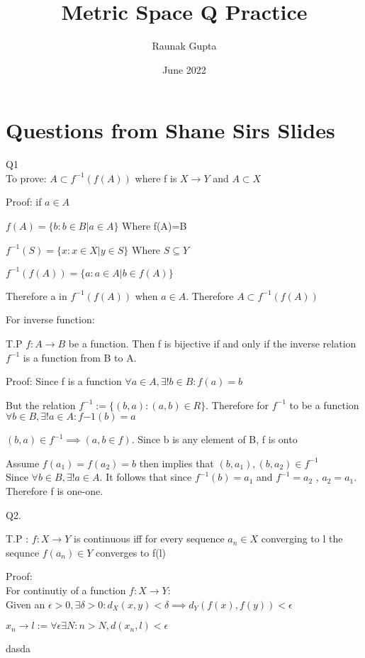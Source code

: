 \documentclass{article}
\title{Metric Space Q Practice}
\author{Raunak Gupta}
\date{June 2022}
\begin{document}
\maketitle

\section{Questions from Shane Sirs Slides}

\proof Q1\\
To prove: $A \subset f^{-1}(f(A))$ where f is $X \rightarrow Y$ and $A \subset X$

Proof: if $a \in A$

$f(A) =\{b : b\in B | a \in A \} $ Where f(A)=B

$f^{-1}(S)= \{x : x \in X | y \in S\}$ Where $S \subseteq Y$

$f^{-1}(f(A)) = \{a : a \in  A| b \in f(A)\} $

Therefore a in $f^{-1}(f(A))$ when $a \in A$. Therefore $A \subset f^{-1}(f(A))$ 




\proof For inverse function:

T.P $f : A \rightarrow B$ be a function. Then f is bijective if and only
if the inverse relation $f^{-1}$ is a function from B to A.

Proof: Since f is a function $\forall a \in A, \exists! b \in B : f(a)=b$

But the relation $f^{-1}:= \{ (b,a) : (a,b) \in R \}$. Therefore for $f^{-1}$ to be a function\\    $\forall b \in B, \exists! a \in A : f{-1}(b)=a$ 

$(b,a) \in f^{-1} \implies (a,b \in f)$. Since b is any element of B, f is onto

Assume $f(a_1)=f(a_2)=b$ then implies that $(b,a_1), (b,a_2) \in f^{-1} $ \\ Since $\forall b \in B, \exists! a \in A$. It follows that since $f^{-1}(b)=a_1$ and  $f^{-1}= a_2$ , $a_2 = a_1$. Therefore f is one-one.


\proof Q2.

T.P : $f: X \rightarrow Y$ is continuous iff for every sequence $a_n \in X$ converging to l the sequnce $f(a_n) \in Y$ converges to f(l)

Proof:\\
For continutiy of a function $f : X \rightarrow Y$:\\
Given an $\epsilon > 0, \exists \delta > 0 : d_X(x,y) < \delta \implies d_Y(f(x),f(y)) < \epsilon $


$x_n \rightarrow l := \forall \epsilon  \exists N :n>N , d(x_n,l)<\epsilon$ 




dasda
\end{document}
